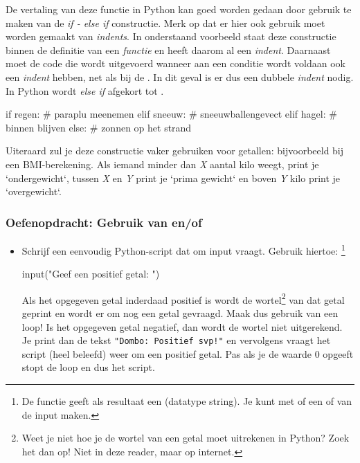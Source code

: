 \documentclass[a4paper,11pt, fleqn]{article}
\begin{document}
De vertaling van deze functie in Python kan goed worden gedaan door gebruik te maken van de \textit{if - else if} constructie. Merk op dat er hier ook gebruik moet worden gemaakt van \textit{indents}. In onderstaand voorbeeld staat deze constructie binnen de definitie van een \textit{functie} en heeft daarom al een \textit{indent}. Daarnaast moet de code die wordt uitgevoerd wanneer aan een conditie wordt voldaan ook een \textit{indent} hebben, net als bij de . In dit geval is er dus een dubbele \textit{indent} nodig. In Python wordt \textit{else if} afgekort tot . 

\begin{python}
if regen:
    # paraplu meenemen
elif sneeuw:
    # sneeuwballengevect
elif hagel:
    # binnen blijven
else:
    # zonnen op het strand
\end{python}

Uiteraard zul je deze constructie vaker gebruiken voor getallen: bijvoorbeeld bij een BMI-berekening. Als iemand minder dan \textit{X} aantal kilo weegt, print je `ondergewicht`, tussen \textit{X} en \textit{Y} print je `prima gewicht` en boven \textit{Y} kilo print je `overgewicht`. 

\subsubsection*{Oefenopdracht: Gebruik van  en/of } 

\begin{itemize}
\item Schrijf een eenvoudig Python-script dat om input vraagt. Gebruik hiertoe: \footnote{De functie  geeft als resultaat een  (datatype string). Je kunt met  of  een  of  van de input maken.}
\begin{python}
input("Geef een positief getal: ")
\end{python}
Als het opgegeven getal inderdaad positief is wordt de wortel\footnote{Weet je niet hoe je de wortel van een getal moet uitrekenen in Python? Zoek het dan op! Niet in deze reader, maar op internet.} van dat getal geprint en wordt er om nog een getal gevraagd. Maak dus gebruik van een loop!
Is het opgegeven getal negatief, dan wordt de wortel niet uitgerekend. Je print dan de tekst \verb."Dombo: Positief svp!". en vervolgens vraagt het script (heel beleefd) weer om een positief getal. Pas als je de waarde 0 opgeeft stopt de loop en dus het script.
\end{itemize}
\end{document}
